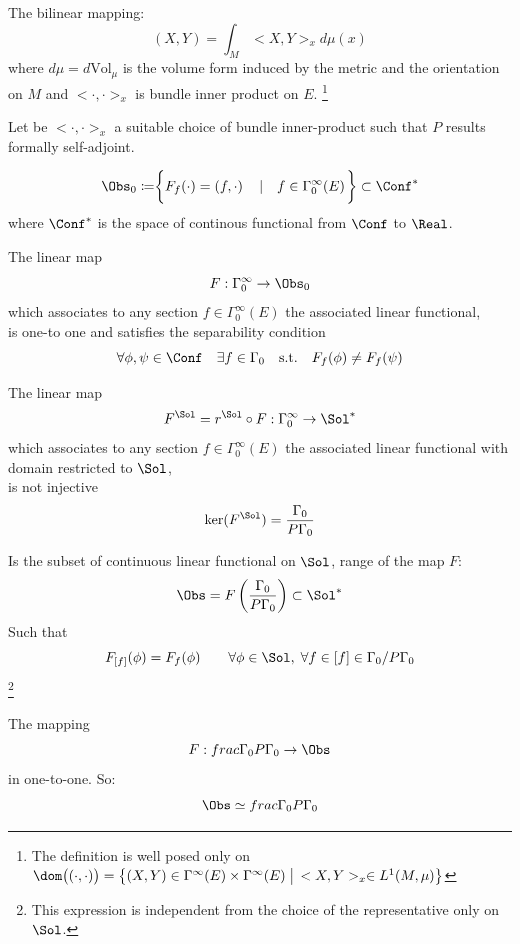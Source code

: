 \documentclass[a4paper,11pt]{scrartcl}
\begin{document}
	\begin{definition}
		The bilinear mapping:
   			$$ (X,Y) = \int_M <X,Y>_x d\mu(x) $$
			where $d\mu = d\textrm{Vol}_\mu$ is the volume form induced by the metric and the orientation on $M$ and $<\cdot,\cdot>_x$ is bundle inner product on $E$.
			\footnote{The definition is well posed only on 
			$ \dom\big( (\cdot, \cdot) \big) =
			 \big\{(X,Y) \in \Gamma^\infty(E) \times \Gamma^\infty(E) \; 
			 \big\vert \,  <X,Y>_x \in L^1(M,\mu)\big \}$}
	\end{definition}
	Let be $<\cdot,\cdot>_x$ a suitable choice of bundle inner-product such that $P$ results formally self-adjoint.
	\begin{definition}
		\begin{displaymath}
			\Obs_0 \coloneqq \biggr\{ F_f (\cdot) = ( f, \cdot ) \quad
			\left\vert\quad  f \in \Gamma_0^\infty(E) \right.	\biggr\} \subset \Conf^* 
		\end{displaymath}
		where $\Conf^* $ is the space of continous functional  from $\Conf$ to $\Real$.
	\end{definition}
	
	\begin{proposition}
		The linear map	 $$ F: \Gamma_0^\infty \rightarrow \Obs_0 $$
		which associates to any section $f\in \Gamma_0^\infty(E)$ the associated linear functional,\\ is one-to one and satisfies the separability condition
				$$ \forall \phi, \psi \in \Conf \quad \exists f \in \Gamma_0 \quad \textrm{s.t.} \quad F_f(\phi) \neq F_f(\psi)$$
	\end{proposition}
		\begin{proposition}
		The linear map	 $$ F^\Sol = r^\Sol \circ F : \Gamma_0^\infty \rightarrow \Sol^* $$
		which associates to any section $f\in \Gamma_0^\infty(E)$ the associated linear functional with domain restricted to $\Sol$,\\
		 is not injective
				$$ \ker(F^\Sol) = \frac{\Gamma_0}{P \Gamma_0}$$
	\end{proposition}
	
	\begin{definition}
		Is the subset of continuous linear functional on $\Sol$, range of the map $F$:
		$$ \Obs = F \left( \frac{\Gamma_0}{P \Gamma_0} \right) \subset \Sol^*$$
		Such that 
		$$   F_{[f]} (\phi) = F_f(\phi) \qquad \forall \phi \in \Sol ,\; \forall f \in [f] \in \Gamma_0 / P \Gamma_0 $$
		\footnote{This expression is independent from the choice of the representative only on $\Sol$.}
	\end{definition}
	\begin{proposition}
	The mapping
	$$ F: frac{\Gamma_0}{P \Gamma_0} \rightarrow \Obs $$ in one-to-one. So:
	$$ \Obs \simeq frac{\Gamma_0}{P \Gamma_0}$$
	\end{proposition}
	
\end{document}
